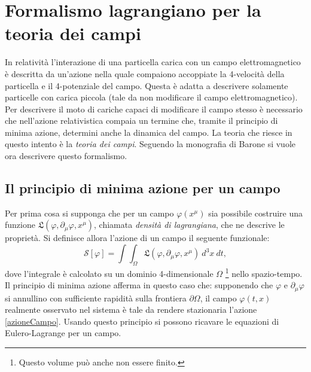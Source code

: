 \section{Formalismo lagrangiano per la teoria dei campi}
In relatività l'interazione di una particella carica con un campo elettromagnetico è descritta da un'azione nella quale compaiono accoppiate la 4-velocità della particella e il 4-potenziale del campo. Questa è adatta a descrivere solamente particelle con carica piccola (tale da non modificare il campo elettromagnetico). Per descrivere il moto di cariche capaci di modificare il campo stesso è necessario che nell'azione relativistica compaia un termine che, tramite il principio di minima azione, determini anche la dinamica del campo. La teoria che riesce in questo intento è la \emph{teoria dei campi}.
\label{sec:lagCampi}
Seguendo la monografia di Barone \cite{Barone} si vuole ora descrivere questo formalismo.
\subsection{Il principio di minima azione per un campo}
Per prima cosa si supponga che per un campo $\varphi(x^\mu)$ sia possibile costruire una funzione $\mathfrak{L}(\varphi,\partial_\mu\varphi,x^\mu)$, chiamata \emph{densità di lagrangiana}, che ne descrive le proprietà.
Si definisce allora l'azione di un campo il seguente funzionale:
\begin{equation}
    \mathcal{S}[\varphi]=\int\int_{\Omega}\mathfrak{L}(\varphi,\partial_\mu\varphi,x^\mu)\ d^3x\ dt,\label{azioneCampo}
\end{equation}
dove l'integrale è calcolato su un dominio 4-dimensionale $\Omega$ \footnote{Questo volume può anche non essere finito.} nello spazio-tempo.\\
Il principio di minima azione afferma in questo caso che: supponendo che $\varphi$ e $\partial_\mu\varphi$ si annullino con sufficiente rapidità sulla frontiera $\partial\Omega$, il campo $\varphi(t,x)$ realmente osservato nel sistema è tale da rendere stazionaria l'azione \eqref{azioneCampo}. Usando questo principio si possono ricavare le equazioni di Eulero-Lagrange per un campo.\\

